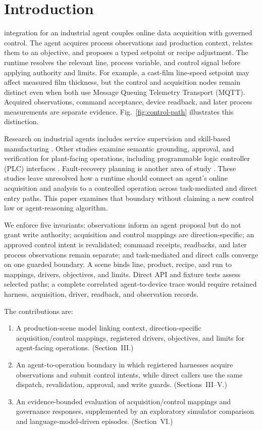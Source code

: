 \documentclass[journal]{IEEEtran}
\begin{document}
\section{Introduction}
 integration for an industrial agent couples online data acquisition with governed control. The agent acquires process observations and production context, relates them to an objective, and proposes a typed setpoint or recipe adjustment. The runtime resolves the relevant line, process variable, and control signal before applying authority and limits. For example, a cast-film line-speed setpoint may affect measured film thickness, but the control and acquisition nodes remain distinct even when both use Message Queuing Telemetry Transport (MQTT). Acquired observations, command acceptance, device readback, and later process measurements are separate evidence. Fig.~\ref{fig:control-path} illustrates this distinction.

Research on industrial agents includes service supervision and skill-based manufacturing \cite{biskupovic2025supervision,koehle2026llmdriven}. Other studies examine semantic grounding, approval, and verification for plant-facing operations, including programmable logic controller (PLC) interfaces \cite{graul2026aas,schall2026safe}. Fault-recovery planning is another area of study \cite{vyas2026detection}. These studies leave unresolved how a runtime should connect an agent's online acquisition and analysis to a controlled operation across task-mediated and direct entry paths. This paper examines that boundary without claiming a new control law or agent-reasoning algorithm.

We enforce five invariants: observations inform an agent proposal but do not grant write authority; acquisition and control mappings are direction-specific; an approved control intent is revalidated; command receipts, readbacks, and later process observations remain separate; and task-mediated and direct calls converge on one guarded boundary. A scene binds line, product, recipe, and run to mappings, drivers, objectives, and limits. Direct API and fixture tests assess selected paths; a complete correlated agent-to-device trace would require retained harness, acquisition, driver, readback, and observation records.

The contributions are:
\begin{enumerate}
  \item A production-scene model linking context, direction-specific acquisition/control mappings, registered drivers, objectives, and limits for agent-facing operations. (Section~III.)
  \item An agent-to-operation boundary in which registered harnesses acquire observations and submit control intents, while direct callers use the same dispatch, revalidation, approval, and write guards. (Sections~III--V.)
  \item An evidence-bounded evaluation of acquisition/control mappings and governance responses, supplemented by an exploratory simulator comparison and language-model-driven episodes. (Section~VI.)
\end{enumerate}
\end{document}
